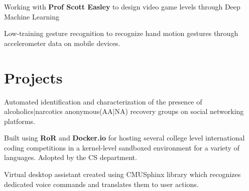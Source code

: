 \documentclass[]{deedy-resume-openfont}
\begin{document}
\begin{minipage}[t]{0.66\textwidth}
Working with \textbf{Prof Scott Easley} to design video game levels through Deep Machine Learning
\sectionsep


Low-training gesture recognition to recognize hand motion gestures through accelerometer data on mobile devices.

\section{Projects}
Automated identification and characterization of the presence of alcoholics|narcotics anonymous(AA|NA) recovery groups on social networking platforms.
\sectionsep

Built using \textbf{RoR} and \textbf{Docker.io} for hosting several college level international coding competitions in a kernel-level sandboxed environment for a variety of languages. Adopted by the CS department.
\sectionsep

Virtual desktop assistant created using CMUSphinx library which recognizes dedicated voice commands and translates them to user actions.
\sectionsep





%
%

\end{minipage} 
\end{document}
